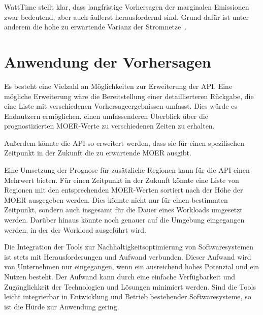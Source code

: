 WattTime stellt klar, dass langfristige Vorhersagen der marginalen Emissionen zwar bedeutend, aber auch äußerst herausfordernd sind.
Grund dafür ist unter anderem die hohe zu erwartende Varianz der Stromnetze~\cite{WattTime.2022}.

\section{Anwendung der Vorhersagen}
Es besteht eine Vielzahl an Möglichkeiten zur Erweiterung der \ac{API}.
Eine mögliche Erweiterung wäre die Bereitstellung einer detaillierteren Rückgabe, die eine Liste mit verschiedenen Vorhersageergebnissen umfasst.
Dies würde es Endnutzern ermöglichen, einen umfassenderen Überblick über die prognostizierten \ac{MOER}-Werte zu verschiedenen Zeiten zu erhalten.

Außerdem könnte die \ac{API} so erweitert werden, dass sie für einen spezifischen Zeitpunkt in der Zukunft die zu erwartende \ac{MOER} ausgibt.

Eine Umsetzung der Prognose für zusätzliche Regionen kann für die \ac{API} einen Mehrwert bieten.
Für einen Zeitpunkt in der Zukunft könnte eine Liste von Regionen mit den entsprechenden \ac{MOER}-Werten sortiert nach der Höhe der \ac{MOER} ausgegeben werden.
Dies könnte nicht nur für einen bestimmten Zeitpunkt, sondern auch insgesamt für die Dauer eines Workloads umgesetzt werden.
Darüber hinaus könnte noch genauer auf die Umgebung eingegangen werden, in der der Workload ausgeführt wird.

Die Integration der Tools zur Nachhaltigkeitsoptimierung von Softwaresystemen ist stets mit Herausforderungen und Aufwand verbunden.
Dieser Aufwand wird von Unternehmen nur eingegangen, wenn ein ausreichend hohes Potenzial und ein Nutzen besteht.
Der Aufwand kann durch eine einfache Verfügbarkeit und Zugänglichkeit der Technologien und Lösungen minimiert werden.
Sind die Tools leicht integrierbar in Entwicklung und Betrieb bestehender Softwaresysteme, so ist die Hürde zur Anwendung gering.

